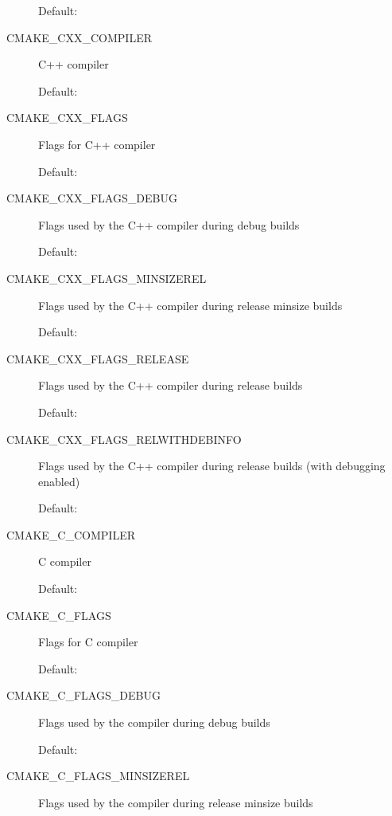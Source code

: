 \documentclass[letterpaper,10pt,english]{sphinxmanual}
\begin{document}
\begin{description}
Default:

\item[{\index{CMAKE\_CXX\_COMPILER (CMake option)}CMAKE\_CXX\_COMPILER}] \leavevmode
C++ compiler

Default: 

\item[{\index{CMAKE\_CXX\_FLAGS (CMake option)}CMAKE\_CXX\_FLAGS}] \leavevmode
Flags for C++ compiler

Default:

\item[{\index{CMAKE\_CXX\_FLAGS\_DEBUG (CMake option)}CMAKE\_CXX\_FLAGS\_DEBUG}] \leavevmode
Flags used by the C++ compiler during debug builds

Default: 

\item[{\index{CMAKE\_CXX\_FLAGS\_MINSIZEREL (CMake option)}CMAKE\_CXX\_FLAGS\_MINSIZEREL}] \leavevmode
Flags used by the C++ compiler during release minsize builds

Default: 

\item[{\index{CMAKE\_CXX\_FLAGS\_RELEASE (CMake option)}CMAKE\_CXX\_FLAGS\_RELEASE}] \leavevmode
Flags used by the C++ compiler during release builds

Default: 

\item[{\index{CMAKE\_CXX\_FLAGS\_RELWITHDEBINFO (CMake option)}CMAKE\_CXX\_FLAGS\_RELWITHDEBINFO}] \leavevmode
Flags used by the C++ compiler during release builds (with
debugging enabled)

Default: 

\item[{\index{CMAKE\_C\_COMPILER (CMake option)}CMAKE\_C\_COMPILER}] \leavevmode
C compiler

Default: 

\item[{\index{CMAKE\_C\_FLAGS (CMake option)}CMAKE\_C\_FLAGS}] \leavevmode
Flags for C compiler

Default:

\item[{\index{CMAKE\_C\_FLAGS\_DEBUG (CMake option)}CMAKE\_C\_FLAGS\_DEBUG}] \leavevmode
Flags used by the compiler during debug
builds

Default: 

\item[{\index{CMAKE\_C\_FLAGS\_MINSIZEREL (CMake option)}CMAKE\_C\_FLAGS\_MINSIZEREL}] \leavevmode
Flags used by the compiler during
release minsize builds


\end{description}
\end{document}
